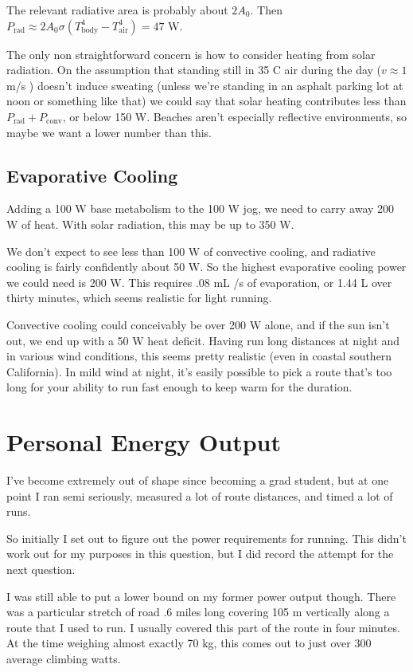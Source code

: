 \documentclass[12pt]{article}
\begin{document}
The relevant radiative area is probably about \(2A_0\). Then \(P_{\mathrm{rad}} \approx 2A_0\sigma(T_{\mathrm{body}}^4 - T_{\mathrm{air}}^4) = 47\) W.

The only non straightforward concern is how to consider heating from solar radiation. On the assumption that standing still in 35 C air during the day (\(v\approx 1\) m/s ) doesn't induce sweating (unless we're standing in an asphalt parking lot at noon or something like that) we could say that solar heating contributes less than \(P_{\mathrm{rad}} + P_{\mathrm{conv}}\), or below 150 W. Beaches aren't especially reflective environments, so maybe we want a lower number than this.

\subsection{Evaporative Cooling}

Adding a 100 W base metabolism to the 100 W jog, we need to carry away 200 W of heat. With solar radiation, this may be up to 350 W.

We don't expect to see less than 100 W of convective cooling, and radiative cooling is fairly confidently about 50 W. So the highest evaporative cooling power we could need is 200 W. This requires .08 mL /s of evaporation, or 1.44 L over thirty minutes, which seems realistic for light running.

Convective cooling could conceivably be over 200 W alone, and if the sun isn't out, we end up with a 50 W heat deficit. Having run long distances at night and in various wind conditions, this seems pretty realistic (even in coastal southern California). In mild wind at night, it's easily possible to pick a route that's too long for your ability to run fast enough to keep warm for the duration.


\section{Personal Energy Output}

I've become extremely out of shape since becoming a grad student, but at one point I ran semi seriously, measured a lot of route distances, and timed a lot of runs.

So initially I set out to figure out the power requirements for running. This didn't work out for my purposes in this question, but I did record the attempt for the next question.

I was still able to put a lower bound on my former power output though. There was a particular stretch of road .6 miles long covering 105 m vertically along a route that I used to run. I usually covered this part of the route in four minutes. At the time weighing almost exactly 70 kg, this comes out to just over 300 average climbing watts.
\end{document}
